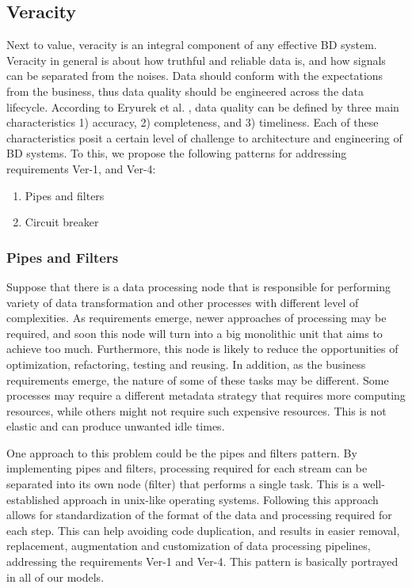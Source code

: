 \documentclass{bmcart}
\begin{document}
\subsection{Veracity}

Next to value, veracity is an integral component of any effective BD system. Veracity in general is about how truthful and reliable data is, and how signals can be separated from the noises. Data should conform with the expectations from the business, thus data quality should be engineered across the data lifecycle. According to Eryurek et al. \cite{eryurek2021data}, data quality can be defined by three main characteristics 1) accuracy, 2) completeness, and 3) timeliness. Each of these characteristics posit a certain level of challenge to architecture and engineering of BD systems. To this, we propose the following patterns for addressing requirements Ver-1, and Ver-4:

\begin{enumerate}
  \item Pipes and filters 
  \item Circuit breaker
\end{enumerate}


\subsubsection{Pipes and Filters}

Suppose that there is a data processing node that is responsible for performing variety of data transformation and other processes with different level of complexities. As requirements emerge, newer approaches of processing may be required, and soon this node will turn into a big monolithic unit that aims to achieve too much. Furthermore, this node is likely to reduce the opportunities of optimization, refactoring, testing and reusing. In addition, as the business requirements emerge, the nature of some of these tasks may be different. Some processes may require a different metadata strategy that requires more computing resources, while others might not require such expensive resources. This is not elastic and can produce unwanted idle times. 

One approach to this problem could be the pipes and filters pattern. By implementing pipes and filters, processing required for each stream can be separated into its own node (filter) that performs a single task. This is a well-established approach in unix-like operating systems. Following this approach allows for standardization of the format of the data and processing required for each step. This can help avoiding code duplication, and results in easier removal, replacement, augmentation and customization of data processing pipelines, addressing the requirements Ver-1 and Ver-4. This pattern is basically portrayed in all of our models.
\end{document}
